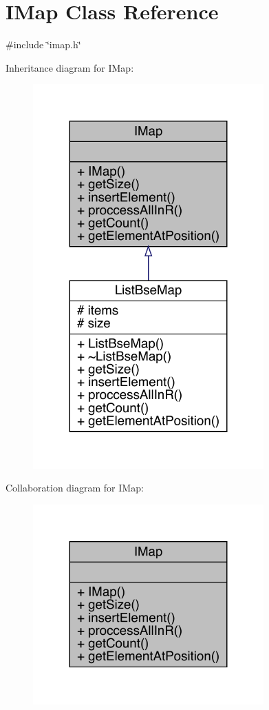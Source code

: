 \hypertarget{a00165}{}\section{I\+Map Class Reference}
\label{a00165}


{\ttfamily \#include \char`\"{}imap.\+h\char`\"{}}



Inheritance diagram for I\+Map\+:
\nopagebreak
\begin{figure}[H]
\begin{center}
\leavevmode
\includegraphics[width=251pt]{db/ddf/a00164}
\end{center}
\end{figure}


Collaboration diagram for I\+Map\+:
\nopagebreak
\begin{figure}[H]
\begin{center}
\leavevmode
\includegraphics[width=251pt]{dd/dae/a00163}
\end{center}
\end{figure}
